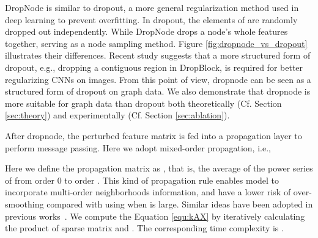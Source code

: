 {DropNode is similar to dropout\cite{srivastava2014dropout}, a more general regularization method used in deep learning to prevent overfitting. 
In dropout, the elements of  are randomly dropped out independently. While DropNode drops a node's whole features together, serving as a node sampling method. 
Figure \ref{fig:dropnode_vs_dropout} illustrates their differences.
Recent study suggests that a more structured form of dropout, e.g., dropping a contiguous region in DropBlock\cite{ghiasi2018dropblock}, is required for better regularizing CNNs on images. From this point of view, dropnode can be seen as a structured form of dropout on graph data.
We also demonstrate that dropnode is more suitable for graph data than dropout both theoretically (Cf. Section \ref{sec:theory}) and experimentally (Cf. Section \ref{sec:ablation}). 




After dropnode, the perturbed feature matrix  is fed into a propagation layer to perform message passing. Here we adopt mixed-order propagation, i.e.,


Here we define the propagation matrix as , that is, the average of the power series of  from order 0 to order . This kind of propagation rule enables model to incorporate multi-order neighborhoods information, and have a lower risk of over-smoothing compared with using  when  is large. Similar ideas have been adopted in previous works~\cite{abu2019mixhop,abu2018n}. We compute the Equation \ref{equ:kAX} by iteratively calculating the product of sparse  matrix  and . The corresponding time complexity is .









}
